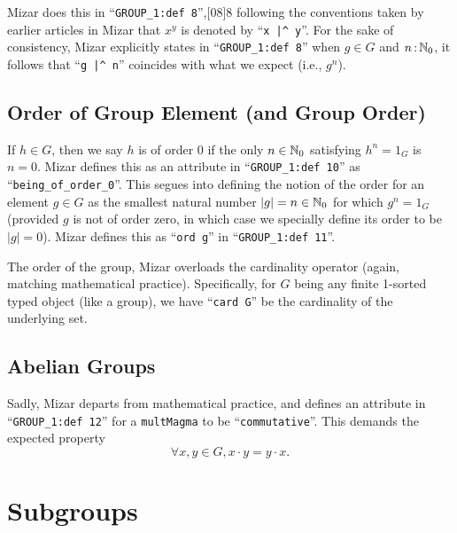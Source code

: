 Mizar does this in
``\verb#GROUP_1:def 8#'',[08]{8} following the conventions
taken by earlier articles in Mizar that $x^{y}$ is denoted by
``\verb#x |^ y#''.
For the sake of consistency, Mizar explicitly states in
``\verb#GROUP_1:def 8#'' when $g\in G$ and $n\mathop{:}\nolimits \mathbb{N}_{0}$, it follows
that ``\verb#g |^ n#'' coincides with what we expect (i.e., $g^{n}$).

\subsection{Order of Group Element (and Group Order)}
If $h\in G$, then we say $h$ is of order 0 if the only $n\in\mathbb{N}_{0}$
satisfying $h^{n}=1_{G}$ is $n=0$. Mizar defines this as an attribute in
``\verb#GROUP_1:def 10#'' as ``\verb#being_of_order_0#''.
This segues into defining the notion of the order for an element $g\in G$
as the smallest natural number $|g|=n\in\mathbb{N}_{0}$ for which $g^{n}=1_{G}$
(provided $g$ is not of order zero, in which case we specially define
its order to be $|g|=0$). Mizar defines this as
``\verb#ord g#'' in ``\verb#GROUP_1:def 11#''.

The order of the group, Mizar overloads the cardinality operator (again,
matching mathematical practice). Specifically,
for $G$ being any finite 1-sorted typed object (like a group), we have
``\verb#card G#'' be the cardinality
of the underlying set.

\subsection{Abelian Groups}
Sadly, Mizar departs from mathematical practice, and defines an
attribute in ``\verb#GROUP_1:def 12#'' for a \verb#multMagma# to be
``\verb#commutative#''.
This demands the expected property
\begin{equation*}
  \forall x,y\in G, x\cdot y=y\cdot x.
\end{equation*}

\section{Subgroups}

